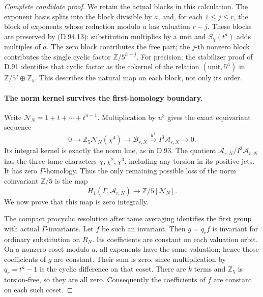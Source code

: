 \begin{proof}[Complete candidate proof]
We retain the actual blocks in this calculation. The exponent
basis splits into the block divisible by \(a\), and, for each
\(1\le j\le r\), the block of exponents whose reduction
modulo \(a\) has valuation \(r-j\). These blocks are
preserved by (D.94.13): substitution multiplies by a unit
and \(S_\chi(t^a)\) adds multiples of \(a\). The zero
block contributes the free part; the \(j\)-th nonzero block
contributes the single cyclic factor \(\mathbb Z/5^{h+j}\).
For precision, the stabilizer proof of D.91 identifies that
cyclic factor as the cokernel of the relation
\((\text{unit},5^h)\) in \(\mathbb Z/5^j\oplus\mathbb Z_5\).
This describes the natural map on each block, not only its order.

\paragraph{The norm kernel survives the first-homology boundary.}
Write \(\mathcal N_N=1+t+\cdots+t^{n-1}\). Multiplication
by \(u^3\) gives the exact equivariant sequence
\[
 0\longrightarrow\mathbb Z_5\mathcal N_N(\chi^4)
 \longrightarrow\mathscr B_{r,N}
 \xrightarrow{u^3} I^3\mathscr A_{r,N}
 \longrightarrow0.
                                                        \tag{D.94.15}
\]
Its integral kernel is exactly the norm line, as in D.93.
The quotient \(\mathscr A_{r,N}/I^3\mathscr A_{r,N}\)
has the three tame characters \(\chi,\chi^2,\chi^3\),
including any torsion in its positive jets. It has zero
\(\Gamma\)-homology. Thus the only remaining possible
loss of the norm coinvariant \(\mathbb Z/5\) is the map
\[
 H_1(\Gamma,\mathscr A_{r,N})\longrightarrow
                          \mathbb Z/5[\mathcal N_N].
                                                        \tag{D.94.16}
\]
We now prove that this map is zero integrally.

The compact procyclic resolution after tame averaging
identifies the first group with actual \(\Gamma\)-invariants.
Let \(f\) be such an invariant. Then \(g=q_rf\) is invariant
for ordinary substitution on \(R_N\). Its coefficients
are constant on each valuation orbit. On a nonzero coset
modulo \(a\), all exponents have the same valuation; hence
those coefficients of \(g\) are constant. Their sum is
zero, since multiplication by \(q_r=t^a-1\) is the cyclic
difference on that coset. There are \(k\) terms and
\(\mathbb Z_5\) is torsion-free, so they are all zero.
Consequently the coefficients of \(f\) are constant on
each such coset.


\end{proof}
